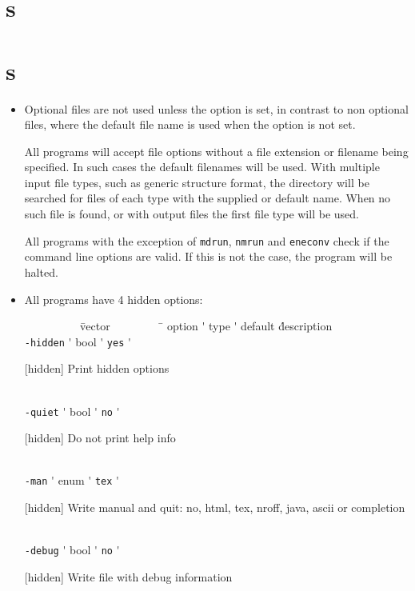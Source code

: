 \section{s}


\section{s}

\begin{itemize}
\item
Optional files are not used unless the option is set, in contrast to
non optional files, where the default file name is used when the
option is not set.

All {\gromacs} programs will accept file options without a file extension
or filename being specified. In such cases the default filenames will
be used. With multiple input file types, such as generic structure
format, the directory will be searched for files of each type with the
supplied or default name. When no such file is found, or with output
files the first file type will be used.

All {\gromacs} programs with the exception of {\tt mdrun},
{\tt nmrun} and {\tt eneconv} check if the command line options
are valid. If this is not the case, the program will be halted.

\item
All {\gromacs} programs have 4 hidden options:\\
\vspace{-5ex}
\begin{tabbing}
{\tt ~~~~~~~~~} \= vector \= {\tt ~~~~~~~~} \= \kill
\> option \'\> type \'\> default \' description \\
\> {\tt -hidden} \'\> bool \'\> {\tt    yes} \' \parbox[t]{0.7\linewidth}{[hidden] Print hidden options}\\
\> {\tt -quiet} \'\> bool \'\> {\tt     no} \' \parbox[t]{0.7\linewidth}{[hidden] Do not print help info}\\
\> {\tt -man} \'\> enum \'\> {\tt tex} \' \parbox[t]{0.7\linewidth}{[hidden] Write manual and quit: no, html, tex, nroff, java, ascii or completion}\\
\> {\tt -debug} \'\> bool \'\> {\tt     no} \' \parbox[t]{0.7\linewidth}{[hidden] Write file with debug information}\\
\end{tabbing}
\vspace{-5ex}


\end{itemize}
